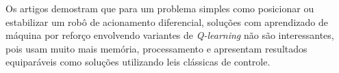 Os artigos demostram que para um problema simples como posicionar ou estabilizar
um robô de acionamento diferencial, soluções com aprendizado de máquina por
reforço envolvendo variantes de \textit{Q-learning} não são interessantes,
pois usam muito mais memória, processamento e apresentam resultados equiparáveis como
soluções utilizando leis clássicas de controle. 